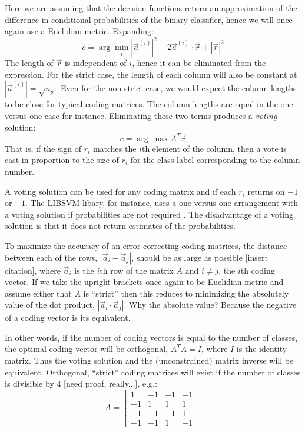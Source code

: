 \documentclass{article}
\begin{document}
Here we are assuming that the decision functions return an approximation of the 
difference in conditional probabilities of the binary classifier, hence we will once again use a
Euclidian metric. Expanding:
\begin{equation}
	c = \arg \min_i |\vec a^{(i)}|^2 - 2 \vec a^{(i)} \cdot \vec r + |\vec r|^2
\end{equation}
The length of $\vec r$ is independent of $i$, hence it can be eliminated from the expression.
For the strict case, the length of each column will also be constant at $|\vec a^{(i)}|=\sqrt{n_p}$.
Even for the non-strict case, we would expect the column lengths to be close for typical coding 
matrices. The column lengths are equal in the one-versus-one case for instance.
Eliminating these two terms produces a {\it voting} solution:
\begin{equation}
	c = \arg \max A^T \vec r
\end{equation}
That is, if the sign of $r_i$ matches the $i$th element of the column, then a vote is cast 
in proportion to the size of $r_i$ for the class label corresponding to the column number.

A voting solution can be used for any coding matrix and if each $r_i$ returns on $-1$ or 
$+1$.  The LIBSVM libary, for instance, uses a one-versus-one arrangement with a voting
solution if probabilities are not required \citep{Chang_Lin2011}.
The disadvantage of a voting solution is
that it does not return estimates of the probabilities.

To maximize the accuracy of an error-correcting coding matrices, the distance
between each of the rows, $| \vec a_i - \vec a_j |$, should be as large as
possible [insert citation], where $\vec a_i$ is the $i$th row of the matrix
$A$ and $i \ne j$, the $i$th coding vector. 
If we take the upright brackets once again to be
Euclidian metric and assume either that $A$ is ``strict'' then this reduces to
minimizing the absolutely value of the dot product, $|\vec a_i \cdot \vec a_j|$.
Why the absolute value? Because the negative of a coding vector is its 
equivalent.

In other words, if the number of coding vectors is equal to the number of classes, the optimal coding vector will be orthogonal, $A^T A = I$, where $I$ is
the identity matrix. Thus the voting solution and the (unconstrained) matrix 
inverse will be equivalent. Orthogonal, ``strict'' coding matrices will exist
if the number of classes is divisible by 4 [need proof, really...], e.g.:
\begin{equation}
A = 
\begin{bmatrix}
1 & -1 & -1 & -1 \\
-1 & 1 & 1 & 1 \\
-1 & -1 & -1 & 1 \\
-1 & -1 & 1 & -1
\end{bmatrix}
\end{equation}
\end{document}

